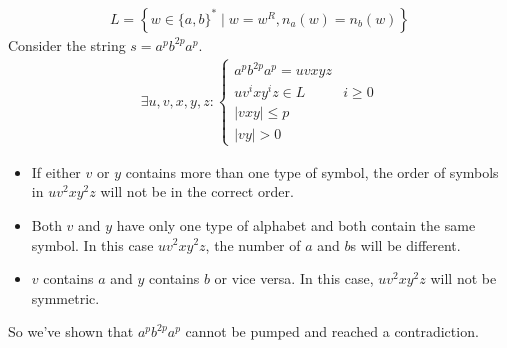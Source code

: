 \documentclass{article}
\numberwithin{equation}{subsection}
\newcommand{\abs}[1]{\vert #1\vert}
\begin{document}
\subsubsection{}
\begin{align*}
L=\left\{w\in \{a, b\}^* \mid w=w^R, n_a(w)=n_b(w)\right\} 
\end{align*}
Consider the string \(s=a^pb^{2p}a^{p}\).
\begin{align*}
\exists u,v,x,y,z:
\begin{cases}
a^pb^{2p}a^{p} = uvxyz&\\
uv^ixy^iz\in L & i\ge 0\\
\abs{vxy} \le p&\\
\abs{vy} > 0&
\end{cases}
\end{align*}
\begin{itemize}
\item If either \(v\) or \(y\) contains more than one type of symbol, the order of symbols in \(uv^2xy^2z\) will not be in the correct order.
\item Both \(v\) and \(y\) have only one type of alphabet and both contain the same symbol.
In this case \(uv^2xy^2z\), the number of \(a\) and \(b\)s will be different.
\item \(v\) contains \(a\) and \(y\) contains \(b\) or vice versa.
In this case, \(uv^2xy^2z\) will not be symmetric.
\end{itemize}
So we've shown that \(a^pb^{2p}a^{p}\) cannot be pumped and reached a contradiction.
\end{document}

